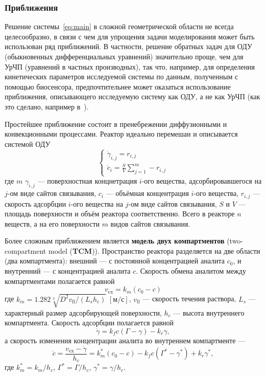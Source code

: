 \documentclass[oneside,final,12pt]{extreport}
\begin{document}
\subsubsection*{Приближения}
Решение системы~\eqref{eq:main} в сложной геометрической области
не всегда целесообразно,
в связи с чем для упрощения задачи моделирования
может быть использован ряд приближений.
В частности, решение обратных задач для ОДУ
(обыкновенных дифференциальных уравнений) значительно проще, чем для УрЧП
(уравнений в частных производных),
так что, например, для определения кинетических параметров исследуемой системы
по данным, полученным с помощью биосенсора, предпочтительнее
может оказаться использование
приближения, описывающего исследуемую систему как ОДУ, а не как УрЧП
(как это сделано, например в~\cite{bib:FULLTEXT_inverse_example}).

Простейшее приближение состоит в пренебрежении диффузионными и конвекционными
процессами. Реактор идеально перемешан и описывается системой ОДУ
\begin{equation}
\begin{cases}
  \dot{\gamma}_{i,j} = r_{i,j}\\
  \dot{c}_i = \frac{S}{V}\sum\limits_{j=1}^{m}-r_{i,j}
\label{eq:perfectly_mixed_ode}
\end{cases}
\end{equation}
где $m$
$\gamma_{i,j}$ --- поверхностная концнетрация $i$-ого вещества,
адсорбировавшегося на $j$-ом виде сайтов связывания,
$c_i$ --- объёмная концентрация $i$-ого вещества,
$r_{i,j}$ --- скорость адсорбции $i$-ого вещества на $j$-ом виде сайтов связывания,
$S$ и $V$ --- площадь поверхности и объём реактора соответственно.
Всего в реакторе $n$ веществ, а на его поверхности $m$ видов сайтов связывания.

Более сложным приближением является \textbf{модель двух компартментов}
(two-compartment model (\textbf{TCM}))\cite{bib:TCM}.
Пространство реактора разделяется на две области (два компартмента):
внешний --- с постоянной концентрацией аналита $c_0$, и
внутренний --- с концентрацией аналита $c$.
Скорость обмена аналитом между компартментами полагается равной
\begin{equation}
  v_\text{ex} = k_m \left(c_0 - c\right)
\label{eq:TCM:exchange}
\end{equation}
где $k_m = 1.282\sqrt[3]{D^2 v_\text{fl} / \left(L_s h_c\right)}\;
  \left[\text{м}/\text{с}\right]$, 
$v_\text{fl}$ --- скорость течения раствора,
$L_s$ --- характерный размер адсорбирующей поверхности,
$h_c$ --- высота внутреннего компартмента.
Скорость адсорбции полагается равной
\begin{equation}
  \dot{\gamma} = k_f c \left(\Gamma - \gamma\right) - k_r\gamma,
\label{eq:TCM:adsorption}
\end{equation}
а скорость изменения концентрации аналита во внутреннем компартменте ---
\begin{equation}
  \dot{c} = \frac{v_\text{ex} - \dot{\gamma}}{h_c} =
            k_m^* \left(c_0 - c\right) - k_f c \left(\Gamma^* - \gamma^*\right) + k_r \gamma^*,
\label{eq:TCM:inner}
\end{equation}
где $k_m^* = k_m/h_c$, $\Gamma^* = \Gamma/h_c$, $\gamma^* = \gamma/h_c$.
\end{document}
